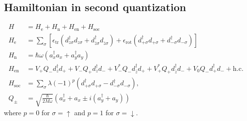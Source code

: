 \documentclass{article}
\newcommand{\pdagger}{{\phantom{\dagger}}}
\begin{document}
\subsection{Hamiltonian in second quantization}
\begin{align}
	H&= H_\mathrm{e}+ H_\mathrm{n} + H_\mathrm{en}+H_\mathrm{soc}\\
	H_\mathrm{e} &= \sum_\sigma \left[ \epsilon_\mathrm{tr}(d_{z\sigma}^\dagger d_{z\sigma}^\pdagger+d_{\bar{z}\sigma}^\dagger d_{\bar{z}\sigma}^\pdagger)+\epsilon_\mathrm{rot}(d_{+\sigma}^\dagger d_{+\sigma}^\pdagger+d_{-\sigma}^\dagger d_{-\sigma}^\pdagger)\right]\\
	H_\mathrm{n} &= \hbar \omega\left( a_x^\dagger a_x^\pdagger + a_y^\dagger a_y^\pdagger\right)\\
	H_\mathrm{en}&= V_+Q_- d_z^\dagger d_+^\pdagger + V_-Q_+ d_z^\dagger d_-^\pdagger + V_-^*Q_- d_{\overline{z}}^\dagger d_+^\pdagger+ V_+^*Q_+ d_{\overline{z}}^\dagger d_-^\pdagger +V_0Q_- d_+^\dagger d_-^\pdagger +\mathrm{h.c.} \\
	H_\mathrm{soc}&= \sum_\sigma \lambda (-1)^{p} (d_{+\sigma}^\dagger d_{+\sigma}^\pdagger - d_{-\sigma}^\dagger d_{-\sigma}^\pdagger),\\
	Q_\pm &= \sqrt{\frac{\hbar}{2M\omega}} (a_x^\dagger +a_x^\pdagger\pm i(a_y^\dagger+a_y^\pdagger))
\end{align}
where $p=0$ for $\sigma=\uparrow$ and $p=1$ for $\sigma=\downarrow$.
\end{document}
